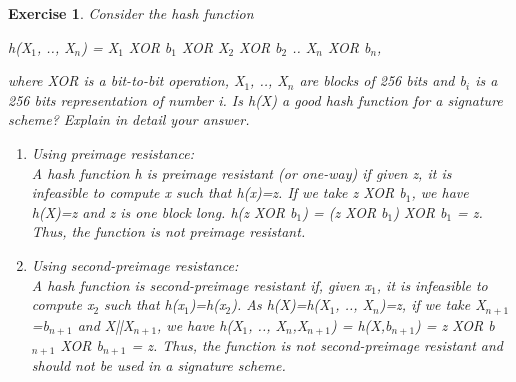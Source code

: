 \documentclass[a4paper, 12pt]{report}
\newtheorem{exercise}{\textbf{Exercise}}
\begin{document}
\begin{exercise}
	Consider the hash function
	\begin{center}
		h(X$_1$, .., X$_n$) = X$_1$ XOR b$_1$ XOR X$_2$ XOR b$_2$ .. X$_n$ XOR b$_n$,
	\end{center}
	where XOR is a bit-to-bit operation, X$_1$, .., X$_n$ are blocks of 256 bits and b$_i$ is a 256 bits representation of number i. Is h(X) a good hash function for a signature scheme? Explain in detail your answer.
	\begin{enumerate}
		\item Using preimage resistance:\\
		A hash function h is preimage resistant (or one-way) if given z, it is infeasible to compute x such that h(x)=z. If we take z XOR b$_1$, we have h(X)=z and z is one block long. h(z XOR b$_1$) = (z XOR b$_1$) XOR b$_1$ = z. Thus, the function is not preimage resistant.
		\item Using second-preimage resistance:\\
		A hash function is second-preimage resistant if, given x$_1$, it is infeasible to compute x$_2$ such that h(x$_1$)=h(x$_2$). As h(X)=h(X$_1$, .., X$_n$)=z, if we take X$_{n+1}$=b$_{n+1}$ and X||X$_{n+1}$, we have h(X$_1$, .., X$_n$,X$_{n+1}$) = h(X,b$_{n+1}$) = z XOR b$_{n+1}$ XOR b$_{n+1}$ = z. Thus, the function is not second-preimage resistant and should not be used in a signature scheme.
	\end{enumerate} 
\end{exercise}
\end{document}
